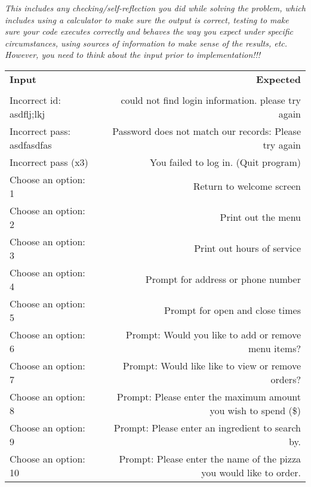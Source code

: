 \documentclass[a4paper, 11pt]{article}
\begin{document}
\textit{This includes any checking/self-reflection you did while solving the
  problem, which includes using a calculator to make sure the output is correct,
  testing to make sure your code executes correctly and behaves the way you
  expect under specific circumstances, using sources of information to make
  sense of the results, etc. However, you need to think about the input prior to
  implementation!!!}\\
\vspace{5em}

\begin{center}
 \begin{tabular}{l|r} %
   \textbf{Input} & \textbf{Expected} \\
    &    \\
   \hline
   Incorrect id: asdflj;lkj & could not find login information. please try again   \\
   Incorrect pass: asdfasdfas & Password does not match our records: Please try again  \\
   Incorrect pass (x3) & You failed to log in. (Quit program)   \\
   Choose an option: 1  &Return to welcome screen  \\
   Choose an option: 2 & Print out the menu  \\
   Choose an option: 3 & Print out hours of service  \\
   Choose an option: 4 & Prompt for address or phone number  \\
   Choose an option: 5 & Prompt for open and close times  \\
   Choose an option: 6 & Prompt: Would you like to add or remove menu items? \\
   Choose an option: 7 & Prompt: Would like like to view or remove orders?  \\
   Choose an option: 8 & Prompt: Please enter the maximum amount you wish to spend (\$)  \\
   Choose an option: 9 & Prompt: Please enter an ingredient to search by.  \\
   Choose an option: 10 & Prompt: Please enter the name of the pizza you would like to order.  \\
 \end{tabular}
\end{center} 
\end{document}

